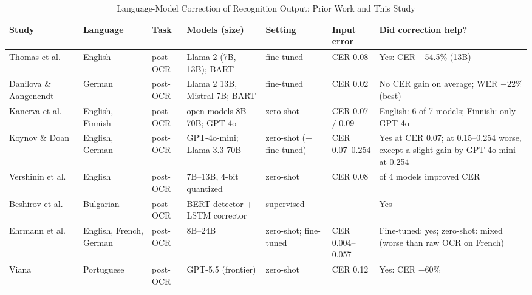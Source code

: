\begin{table}[t]
\centering
\caption{Language-Model Correction of Recognition Output: Prior Work and This Study}
\label{tab:literature}
\setlength{\tabcolsep}{3.5pt}
\footnotesize
\renewcommand{\arraystretch}{1.15}
\begin{tabular}{>{\raggedright\arraybackslash}p{2.7cm}>{\raggedright\arraybackslash}p{1.25cm}>{\raggedright\arraybackslash}p{1.45cm}>{\raggedright\arraybackslash}p{3.3cm}>{\raggedright\arraybackslash}p{1.6cm}>{\raggedright\arraybackslash}p{1.55cm}>{\raggedright\arraybackslash}p{3.65cm}}
\toprule
Study & Language & Task & Models (size) & Setting & Input error & Did correction help? \\
\midrule
Thomas et al.~\cite{thomas2024leveraging} & English & post-OCR & Llama 2 (7B, 13B); BART & fine-tuned & CER 0.08 & Yes: CER $-$54.5\% (13B) \\
Danilova \& Aangenendt~\cite{danilova2025german} & German & post-OCR & Llama 2 13B, Mistral 7B; BART & fine-tuned & CER 0.02 & No CER gain on average; WER $-$22\% (best) \\
Kanerva et al.~\cite{kanerva2025nofreelunches} & English, Finnish & post-OCR & open models 8B--70B; GPT-4o & zero-shot & CER 0.07 / 0.09 & English: 6 of 7 models; Finnish: only GPT-4o \\
Koynov \& Doan~\cite{koynov2025opportunities} & English, German & post-OCR & GPT-4o-mini; Llama 3.3 70B & zero-shot (+ fine-tuned) & CER 0.07--0.254 & Yes at CER 0.07; at 0.15--0.254 worse, except a slight gain by GPT-4o mini at 0.254 \\
Vershinin et al.~\cite{vershinin2025lightweight} & English & post-OCR & 7B--13B, 4-bit quantized & zero-shot & CER 0.08 & 1 of 4 models improved CER \\
Beshirov et al.~\cite{beshirov2025bulgarian} & Bulgarian & post-OCR & BERT detector + LSTM corrector & supervised & --- & Yes \\
Ehrmann et al.~\cite{ehrmann2026hipeocrepair} & English, French, German & post-OCR & 8B--24B & zero-shot; fine-tuned & CER 0.004--0.057 & Fine-tuned: yes; zero-shot: mixed (worse than raw OCR on French) \\
Viana~\cite{viana2026reframing} & Portuguese & post-OCR & GPT-5.5 (frontier) & zero-shot & CER 0.12 & Yes: CER $-$60\% \\

\end{tabular}
\end{table}
